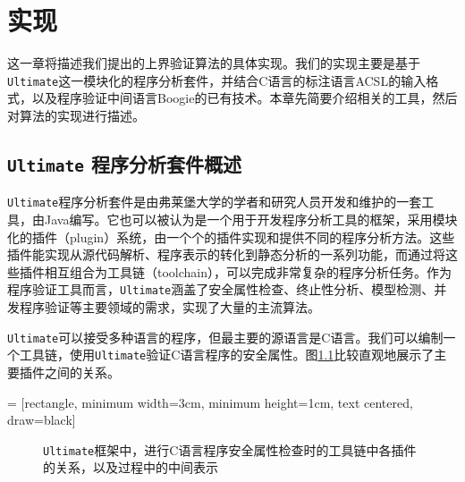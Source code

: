 
\chapter{实现}

这一章将描述我们提出的上界验证算法的具体实现。我们的实现主要是基于\texttt{Ultimate}这一模块化的程序分析套件，并结合C语言的标注语言ACSL的输入格式，以及程序验证中间语言Boogie的已有技术。本章先简要介绍相关的工具，然后对算法的实现进行描述。

\section{\texttt{Ultimate} 程序分析套件概述}

\texttt{Ultimate}程序分析套件\cite{heizmann_software_2013, heizmann_termination_2014,chen_advanced_2018}是由弗莱堡大学的学者和研究人员开发和维护的一套工具，由Java编写。它也可以被认为是一个用于开发程序分析工具的框架，采用模块化的插件（plugin）系统，由一个个的插件实现和提供不同的程序分析方法。这些插件能实现从源代码解析、程序表示的转化到静态分析的一系列功能，而通过将这些插件相互组合为工具链（toolchain），可以完成非常复杂的程序分析任务。作为程序验证工具而言，\texttt{Ultimate}涵盖了安全属性检查\cite{heizmann_software_2013}、终止性分析\cite{heizmann_termination_2014}、模型检测、并发程序验证等主要领域的需求，实现了大量的主流算法。

\texttt{Ultimate}可以接受多种语言的程序，但最主要的源语言是C语言。我们可以编制一个工具链，使用\texttt{Ultimate}验证C语言程序的安全属性。图\ref{fig:ultimate-example}比较直观地展示了主要插件之间的关系。

 = [rectangle, minimum width=3cm, minimum height=1cm, text centered, draw=black]

\begin{figure}
    \centering
    \caption{\texttt{Ultimate}框架中，进行C语言程序安全属性检查时的工具链中各插件的关系，以及过程中的中间表示}
    \label{fig:ultimate-example}
\end{figure}

